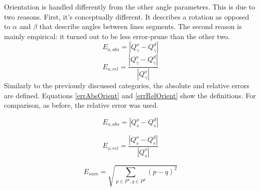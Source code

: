 Orientation is handled differently from the other angle parameters.
This is due to two reasons.
First, it's conceptually different.
It describes a rotation as opposed to $\alpha$ and $\beta$ that describe angles between lines segments.
The second reason is mainly empirical: it turned out to be less error-prune than the other two.
\begin{equation}
	E_{o,abs} = |Q_\gamma^o - Q_\gamma^d|
	\label{eq:errAbsOrient}
\end{equation}
\begin{equation}
	E_{o,rel} = \frac{|Q_\gamma^o - Q_\gamma^d|}{|Q_\gamma^o|}
	\label{eq:errRelOrient}
\end{equation}
Similarly to the previously discussed categories, the absolute and relative errors are defined.
Equations \eqref{errAbsOrient} and \eqref{errRelOrient} show the definitions.
For comparison, as before, the relative error was used.


\begin{equation}
	E_{o,abs} = |Q_s^o - Q_s^d|
	\label{eq:errAbsSize}
\end{equation}

\begin{equation}
	E_{o,rel} = \frac{|Q_s^o - Q_s^d|}{|Q_s^o|}
	\label{eq:errRelSize}
\end{equation}

\begin{equation}
	E_{sum} = \sqrt{\sum_{p \in P^o, q \in P^d} (p - q)^2}
\end{equation}
